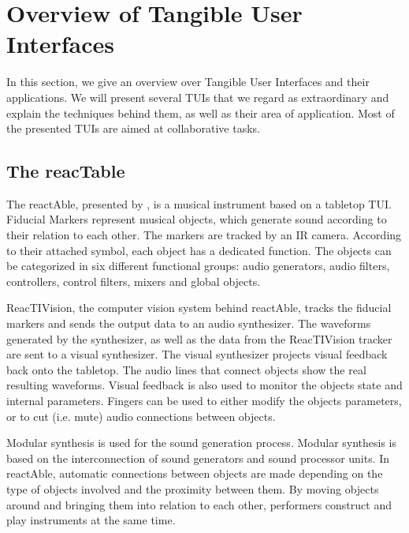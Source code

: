 \section{Overview of Tangible User Interfaces}

In this section, we give an overview over Tangible User Interfaces and their applications. We will present several TUIs that we regard as extraordinary and explain the techniques behind them, as well as their area of application. Most of the presented TUIs are aimed at collaborative tasks.

\subsection{The reacTable}

The reactAble, presented by \cite{jorda07}, is a musical instrument based on a tabletop TUI. Fiducial Markers represent musical objects, which generate sound according to their relation to each other. The markers are tracked by an IR camera. According to their attached symbol, each object has a dedicated function. The objects can be categorized in six different functional groups: audio generators, audio filters, controllers, control filters, mixers and global objects. 

ReacTIVision, the computer vision system behind reactAble, tracks the fiducial markers and sends the output data to an audio synthesizer. The waveforms generated by the synthesizer, as well as the data from the ReacTIVision tracker are sent to a visual synthesizer. The visual synthesizer projects visual feedback back onto the tabletop. The audio lines that connect objects show the real resulting waveforms. Visual feedback is also used to monitor the objects state and internal parameters. Fingers can be used to either modify the objects parameters, or to cut (i.e. mute) audio connections between objects. 

Modular synthesis is used for the sound generation process. Modular synthesis is based on the interconnection of sound generators and sound processor units. In reactAble, automatic connections between objects are made depending on the type of objects involved and the proximity between them. By moving objects around and bringing them into relation to each other, performers construct and play instruments at the same time. 

